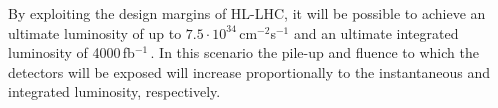 \documentclass{article}
\begin{document}




By exploiting the design margins of HL-LHC, it will be possible to achieve an ultimate luminosity of up to $7.5 \cdot 10^{34}$\,cm$^{-2}$s$^{-1}$ and an ultimate integrated luminosity of 4000\,fb$^{-1}$\,\cite{hlLhcTecDesRep}.
In this scenario the pile-up and fluence to which the detectors will be exposed will increase proportionally to the instantaneous and integrated luminosity, respectively.

\end{document}
